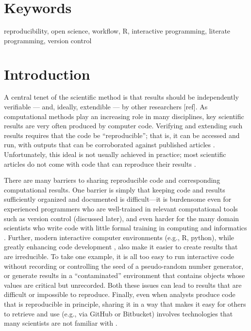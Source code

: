 \documentclass[9pt,a4paper]{extarticle}
\begin{document}
\section*{Keywords}

reproducibility, open science, workflow, R, interactive programming,
literate programming, version control

\clearpage

\pagestyle{main}


\section*{Introduction}

A central tenet of the scientific method is that results should be
independently verifiable --- and, ideally, extendible --- by other
researchers [ref]. As computational methods play an increasing role in
many disciplines, key scientific results are very often produced by
computer code. Verifying and extending such results requires that the
code be ``reproducible''; that is, it can be accessed and run, with
outputs that can be corroborated against published articles
\cite{Buckheit1995, Gentleman2005, Peng2011, Ince2012, Morin2012,
Sandve2013, Easterbrook2014, Stodden2016, Lowndes2017}. Unfortunately,
this ideal is not usually achieved in practice; most scientific articles
do not come with code that can reproduce their results
\cite{Ioannidis2009, Ioannidis2014, Stodden2018}.

There are many barriers to sharing reproducible code and corresponding
computational results. One barrier is simply that keeping code and
results sufficiently organized and documented is difficult—it is
burdensome even for experienced programmers who are well-trained in
relevant computational tools such as version control (discussed later),
and even harder for the many domain scientists who write code with
little formal training in computing and informatics \cite{Wilson2014b}.
Further, modern interactive computer environments (e.g., R, python),
while greatly enhancing code development \cite{Findler2002}, also make
it easier to create results that are irreducible. To take one example,
it is all too easy to run interactive code without recording or
controlling the seed of a pseudo-random number generator, or generate
results in a ``contaminated'' environment that contains objects whose
values are critical but unrecorded. Both these issues can lead to
results that are difficult or impossible to reproduce. Finally, even
when analysts produce code that is reproducible in principle, sharing it
in a way that makes it easy for others to retrieve and use (e.g., via
GitHub or Bitbucket) involves technologies that many scientists are not
familiar with \cite{Stodden2018}.
\end{document}
